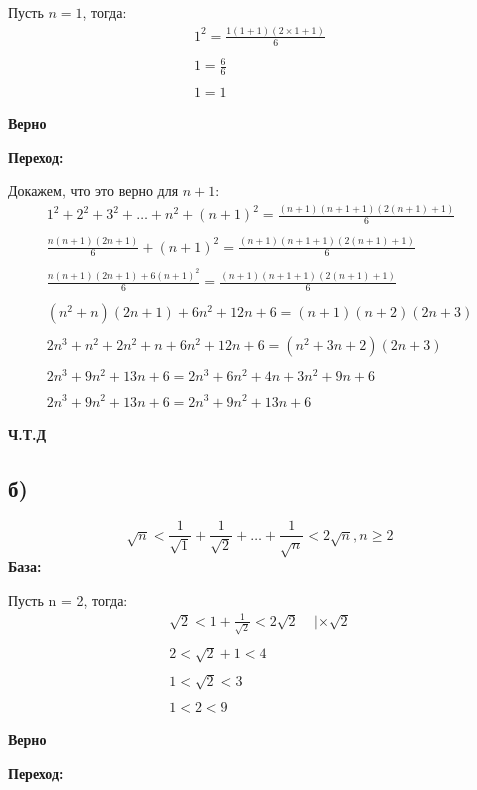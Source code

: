 \documentclass[a4p aper,12pt]{article}
\begin{document}
{Пусть $n = 1$, тогда:
\begin{equation*}
\begin{gathered}
1^2 = \frac{1(1+1)(2\times1+1)}{6} \\\\
1 = \frac{6}{6}\\\\
1 = 1
\end{gathered}
\end{equation*}
 \begin{center}
\textbf{Верно}
\end{center}
\textbf{Переход:}

Докажем, что это верно для $n+1$:
\begin{equation*}
\begin{gathered}
1^2+2^2+3^2+\ldots+n^2+(n+1)^2 = \frac{(n+1)(n+1+1)(2(n+1)+1)}{6}\\\\
\frac{n(n+1)(2n+1)}{6}+(n+1)^2 =  \frac{(n+1)(n+1+1)(2(n+1)+1)}{6}\\\\
\frac{n(n+1)(2n+1)+6(n+1)^2}{6}  =  \frac{(n+1)(n+1+1)(2(n+1)+1)}{6}\\\\
(n^2+n)(2n+1)+6n^2+12n+6 = (n+1)(n+2)(2n+3)\\\\
2n^3+n^2+2n^2+n+6n^2+12n +6 = (n^2+3n+2)(2n+3)\\\\
2n^3+9n^2+13n+6=2n^3+6n^2+4n+3n^2+9n+6\\\\
2n^3+9n^2+13n+6=2n^3+9n^2+13n+6
\end{gathered}
\end{equation*}
\begin{center}
\textbf{Ч.Т.Д}
\end{center}
\subsection*{б)}
\[
\sqrt{n}< \frac{1}{\sqrt1}+\frac{1}{\sqrt{2}} + \ldots + \frac{1}{\sqrt{n}} < 2\sqrt{n}, n\geq2
\]
\textbf{База:}

Пусть n = 2, тогда:
\begin{equation*}
\begin{gathered}
\sqrt{2} < 1 + \frac{1}{\sqrt{2}} < 2\sqrt{2} \;\;\;\; | \times \sqrt{2}\\\\
2 < \sqrt{2} + 1 < 4\\\\
1 < \sqrt{2} < 3\\\\
1 < 2 < 9
\end{gathered}
\end{equation*}
\begin{center}
\textbf{Верно}
\end{center}
\textbf{Переход:}

}
\end{document}
